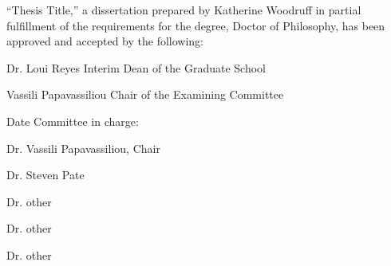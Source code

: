 \noindent
``Thesis Title,'' 
a dissertation prepared by
Katherine Woodruff 
in partial fulfillment of the requirements for the degree, 
Doctor of Philosophy,
has been approved and accepted by the following:

\setlength{\baselineskip}{\singlespace}
\vspace{0.1in}
\begin{flushleft}
\hrulefill
\newline
Dr. Loui Reyes
\newline
Interim Dean of the Graduate School
\vspace{0.5in}

\hrulefill
\newline
Vassili Papavassiliou
\newline
Chair of the Examining Committee
\vspace{0.5in}

\hrulefill
\newline
Date
\vspace{0.5in}
\newline
Committee in charge:
\end{flushleft}

\setlength{\baselineskip}{\doublespace}
Dr. Vassili Papavassiliou, Chair

Dr. Steven Pate

Dr. other

Dr. other

Dr. other

\newpage
